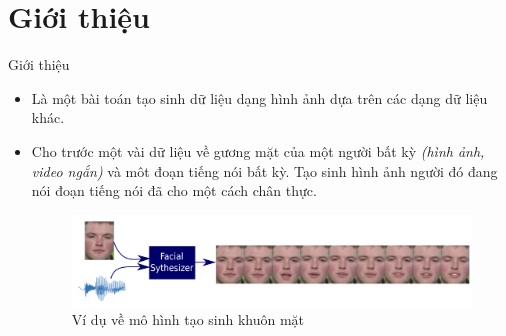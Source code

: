 \section{Giới thiệu}\label{sec:intro}
\frame{\tableofcontents[currentsection]}
\begin{frame}{Giới thiệu}

\begin{itemize}
    \item <1-> Là một bài toán tạo sinh dữ liệu dạng hình ảnh dựa trên các dạng dữ liệu khác.
    \item <2-> Cho trước một vài dữ liệu về gương mặt của một người bất kỳ \textit{(hình ảnh, video ngắn)} và môt đoạn tiếng nói bất kỳ. Tạo sinh hình ảnh người đó đang nói đoạn tiếng nói đã cho một cách chân thực.
\begin{figure}[H]
    \centering
    \includegraphics[width=13cm]{images/intro.png}
    \caption{Ví dụ về mô hình tạo sinh khuôn mặt}
    \label{fig:example}
\end{figure}
\end{itemize}
\end{frame}
